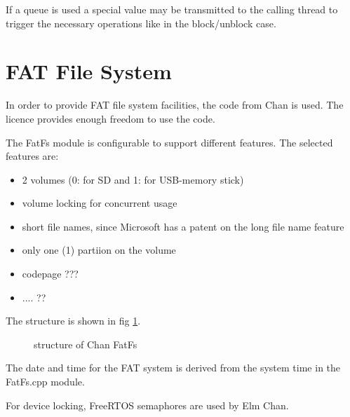 If a queue is used a special value may be transmitted to the calling thread to trigger 
the necessary operations like in the block/unblock case.



\section{FAT File System}
In order to provide FAT file system facilities, the code from Chan
is used. 
The licence provides enough freedom to use the code.

The FatFs module is configurable to support different features. 
The selected features are:
\begin{itemize}
\item 2 volumes (0: for SD and 1: for USB-memory stick)
\item volume locking for concurrent usage
\item short file names,
      since Microsoft has a patent on the long file name feature
\item only one (1) partiion on the volume
\item codepage ???
\item .... ??
\end{itemize}

The structure is shown in fig \ref{fig_chanfs}.
\begin{figure}
\setlength{\unitlength}{1mm}
\begin{center}
\caption{structure of Chan FatFs}
\label{fig_chanfs}
\end{center}
\end{figure}

The date and time for the FAT system is derived from the system time
in the FatFs.cpp module.

For device locking, FreeRTOS semaphores are used by Elm Chan.

